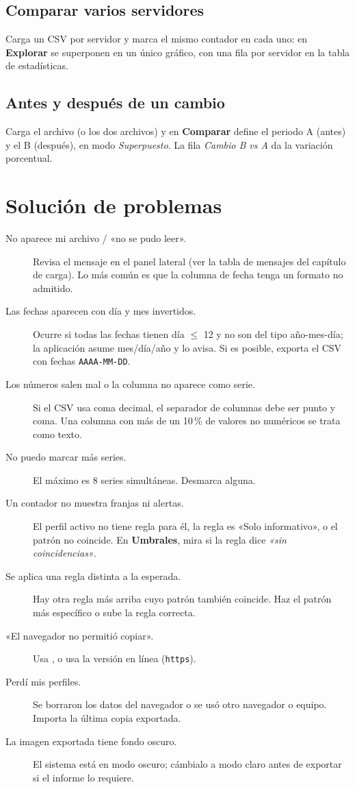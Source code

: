\documentclass[11pt,a4paper,oneside]{report}
\newcommand{\boton}[1]{\fcolorbox{linea}{white}{\small\sffamily #1}}
\newcommand{\pestana}[1]{\textsf{\textbf{\color{acento}#1}}}
\begin{document}
\section{Comparar varios servidores}
Carga un CSV por servidor y marca el mismo contador en cada uno: en
\pestana{Explorar} se superponen en un único gráfico, con una fila por
servidor en la tabla de estadísticas.

\section{Antes y después de un cambio}
Carga el archivo (o los dos archivos) y en \pestana{Comparar} define el
periodo A (antes) y el B (después), en modo \emph{Superpuesto}. La fila
\emph{Cambio B vs A} da la variación porcentual.

\chapter{Solución de problemas}

\begin{description}
  \item[No aparece mi archivo / «no se pudo leer».] Revisa el mensaje en el
    panel lateral (ver la tabla de mensajes del capítulo de carga). Lo más
    común es que la columna de fecha tenga un formato no admitido.
  \item[Las fechas aparecen con día y mes invertidos.] Ocurre si todas las
    fechas tienen día $\le$ 12 y no son del tipo año-mes-día; la aplicación
    asume mes/día/año y lo avisa. Si es posible, exporta el CSV con fechas
    \texttt{AAAA-MM-DD}.
  \item[Los números salen mal o la columna no aparece como serie.] Si el CSV
    usa coma decimal, el separador de columnas debe ser punto y coma. Una
    columna con más de un 10\,\% de valores no numéricos se trata como texto.
  \item[No puedo marcar más series.] El máximo es 8 series simultáneas.
    Desmarca alguna.
  \item[Un contador no muestra franjas ni alertas.] El perfil activo no tiene
    regla para él, la regla es «Solo informativo», o el patrón no coincide.
    En \pestana{Umbrales}, mira si la regla dice \emph{«sin coincidencias»}.
  \item[Se aplica una regla distinta a la esperada.] Hay otra regla más arriba
    cuyo patrón también coincide. Haz el patrón más específico o sube la
    regla correcta.
  \item[«El navegador no permitió copiar».] Usa \boton{Descargar gráfico}, o
    usa la versión en línea (\texttt{https}).
  \item[Perdí mis perfiles.] Se borraron los datos del navegador o se usó otro
    navegador o equipo. Importa la última copia exportada.
  \item[La imagen exportada tiene fondo oscuro.] El sistema está en modo
    oscuro; cámbialo a modo claro antes de exportar si el informe lo
    requiere.
\end{description}
\end{document}
